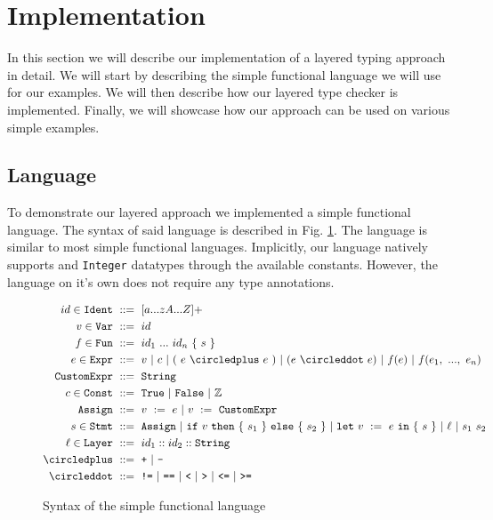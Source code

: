 \section{Implementation}
\label{sec:implementation}

In this section we will describe our implementation of a layered typing approach in detail. We will start by describing the simple functional language we will use for our examples. We will then describe how our layered type checker is implemented. Finally, we will showcase how our approach can be used on various simple examples.

\subsection{Language}
\label{ssec:language}

To demonstrate our layered approach we implemented a simple functional language. The syntax of said language is described in Fig. \ref{fig:lang}. The language is similar to most simple functional languages. Implicitly, our language natively supports  and \texttt{Integer} datatypes through the available constants. However, the language on it's own does not require any type annotations.

\begin{figure}[ht!]
\begin{align*}
	id \in \texttt{Ident}\ 	&::=\ [a...zA...Z]+ \\
	v \in \texttt{Var}\ 	&::=\ id \\
	f \in \texttt{Fun}\ 	&::=\ id_1\ ...\ id_n\ \{\ s\ \}\\
	e \in \texttt{Expr}\ 	&::=\ v\ |\ c\ |\ (\ e\ \circledplus\ e\ )\ |\ (e\ \circleddot\ e)\ |\ f(e)\ |\ f(e_1,\ ...,\ e_n)  \\
	\texttt{CustomExpr}\ 	&::=\ \texttt{String}\\
	c \in \texttt{Const}\ 	&::=\ \texttt{True}\ |\ \texttt{False}\ |\ \mathbb{Z} \\
	\texttt{Assign}\ 	&::=\ v\ :=\ e\ |\ v\ :=\ \texttt{CustomExpr}\ \\
	s \in \texttt{Stmt}\ 	&::=\ \texttt{Assign}\ |\ \texttt{if}\ v\ \texttt{then}\ \lbrace\ s_1\ \rbrace\ \texttt{else}\ \lbrace\ s_2\ \rbrace\ |\ \texttt{let}\ v\ :=\ e\ \texttt{in}\ \lbrace\ s\ \rbrace\ |\ \ell\ |\ s_1\ s_2\ \\
	\ell \in \texttt{Layer}\ 	&::=\ id_1::id_2::\texttt{String} \\
	\circledplus\ 		&::=\ \texttt{+}\ |\ \texttt{-} \\
	\circleddot\ 		&::=\ \texttt{!=}\ |\ \texttt{==}\ |\ \texttt{<} \ |\ \texttt{>} \ |\ \texttt{<=} \ |\ \texttt{>=} \\
\end{align*}
\caption{Syntax of the simple functional language}
\label{fig:lang}
\end{figure}

